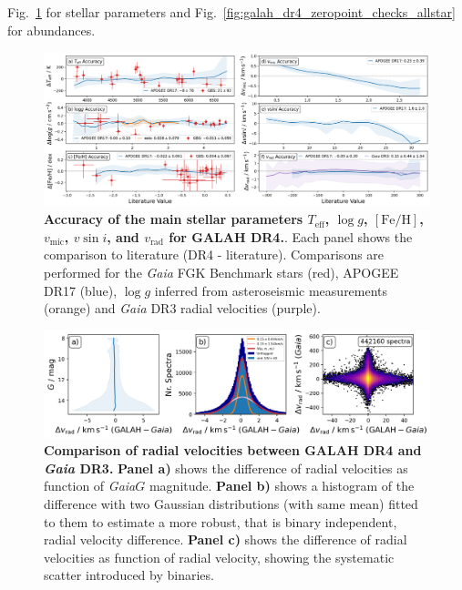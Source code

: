 \documentclass[
  journal=pasa,
  manuscript=research-paper, %
  year=2023,
  volume=37
]{cup-journal}
\newcommand{\SB}[1]{{\textcolor{purple}{#1}}}
\newcommand{\Teff}{$T_\mathrm{eff}$\xspace}
\newcommand{\logg}{$\log g$\xspace}
\newcommand{\feh}{$\mathrm{[Fe/H]}$\xspace}
\newcommand{\vmic}{$v_\mathrm{mic}$\xspace}
\newcommand{\vsini}{$v \sin i$\xspace}
\newcommand{\vrad}{$v_\mathrm{rad}$\xspace}
\newcommand{\Gaia}{\textit{Gaia}\xspace}
\begin{document}

Fig.~\ref{fig:galah_dr4_validation_parameter_accuracy_allstar} for stellar parameters and Fig.~\ref{fig:galah_dr4_zeropoint_checks_allstar} for abundances.

\begin{figure}[ht]
 \centering
 \includegraphics[width=\textwidth]{figures/galah_dr4_validation_parameter_accuracy_allstar.png}
 \caption{\textbf{Accuracy of the main stellar parameters \Teff, \logg, \feh, \vmic, \vsini, and \vrad for GALAH DR4.}. Each panel shows the comparison to literature (DR4 - literature). Comparisons are performed for the \Gaia FGK Benchmark stars (red), APOGEE DR17 (blue), \logg inferred from asteroseismic measurements (orange) and \Gaia DR3 radial velocities (purple).}
 \label{fig:galah_dr4_validation_parameter_accuracy_allstar}
\end{figure}

\begin{figure}[ht]
 \centering
 \includegraphics[width=\textwidth]{figures/galah_dr4_vrad_gaia_dr3.png}
 \caption{\textbf{Comparison of radial velocities between GALAH DR4 and \Gaia DR3.}
 \textbf{Panel a)} shows the difference of radial velocities as function of \Gaia $G$ magnitude.
 \textbf{Panel b)} shows a histogram of the difference with two Gaussian distributions (with same mean) fitted to them to estimate a more robust, that is binary independent, radial velocity difference.
 \textbf{Panel c)} shows the difference of radial velocities as function of radial velocity, showing the systematic scatter introduced by binaries.
}
 \label{fig:galah_dr4_vrad_gaia_dr3}
\end{figure}
\end{document}
